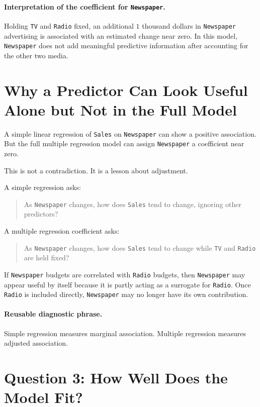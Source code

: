 \paragraph{Interpretation of the coefficient for \texttt{Newspaper}.}
Holding \texttt{TV} and \texttt{Radio} fixed, an additional \(1\) thousand dollars in \texttt{Newspaper} advertising is associated with an estimated change near zero.  In this model, \texttt{Newspaper} does not add meaningful predictive information after accounting for the other two media.

\section{Why a Predictor Can Look Useful Alone but Not in the Full Model}

A simple linear regression of \texttt{Sales} on \texttt{Newspaper} can show a positive association.  But the full multiple regression model can assign \texttt{Newspaper} a coefficient near zero.

This is not a contradiction.  It is a lesson about adjustment.

A simple regression asks:
\begin{quote}
  As \texttt{Newspaper} changes, how does \texttt{Sales} tend to change, ignoring other predictors?
\end{quote}
A multiple regression coefficient asks:
\begin{quote}
  As \texttt{Newspaper} changes, how does \texttt{Sales} tend to change while \texttt{TV} and \texttt{Radio} are held fixed?
\end{quote}

If \texttt{Newspaper} budgets are correlated with \texttt{Radio} budgets, then \texttt{Newspaper} may appear useful by itself because it is partly acting as a surrogate for \texttt{Radio}.  Once \texttt{Radio} is included directly, \texttt{Newspaper} may no longer have its own contribution.

\paragraph{Reusable diagnostic phrase.}
Simple regression measures marginal association.  Multiple regression measures adjusted association.

\section{Question 3: How Well Does the Model Fit?}

